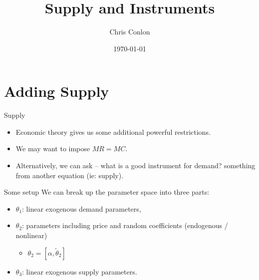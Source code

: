 \documentclass[xcolor=pdftex,dvipsnames,table,mathserif,aspectratio=169]{beamer}
\begin{document}
\title{Supply and Instruments}
\author{Chris Conlon}
\date{\today}

\frame{\titlepage}

\section{Adding Supply}
\begin{frame}{Supply}
\begin{itemize}
\item Economic theory gives us some additional powerful restrictions.
\item We may want to impose $MR = MC$.
\item Alternatively, we can ask -- what is a good instrument for demand? \alert{something from another equation} (ie: supply).
\end{itemize}
\end{frame}

\begin{frame}{Some setup}
We can break up the parameter space into three parts:
\begin{itemize}
\item $\theta_1$: linear exogenous demand parameters, 
 \item $\theta_2$: parameters including price and random coefficients (endogenous / nonlinear)
 \begin{itemize}
 \item $\theta_2 = [\alpha, \widetilde{\theta}_2]$
\end{itemize}
 \item $\theta_3$: linear exogenous supply parameters.
\end{itemize}
\end{frame}
\end{document}
